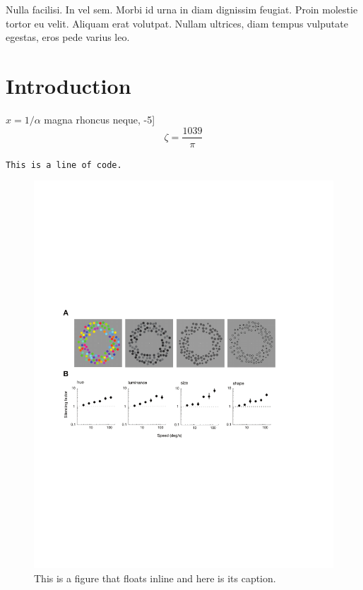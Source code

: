 \begin{savequote}[75mm]
Nulla facilisi. In vel sem. Morbi id urna in diam dignissim feugiat. Proin molestie tortor eu velit. Aliquam erat volutpat. Nullam ultrices, diam tempus vulputate egestas, eros pede varius leo.
\end{savequote}

\chapter{Introduction}

 \lipsum[1]
$x = 1/\alpha$ magna rhoncus neque, -5] 
$$\zeta = \frac{1039}{\pi}$$

\lipsum[2-6]

\texttt{This is a line of code.}

\lipsum[1-10]

\begin{figure}
\includegraphics[width=\textwidth]{figures/fig1}
\caption[Short figure name.]{This is a figure that floats inline and here is its caption.
\label{fig:myInlineFigure}}
\end{figure}

